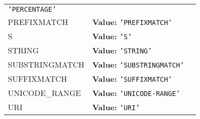 \begin{longtable}{|p{\varnamewidth}|p{\vardescrwidth}|l}
{\tt \texttt{'}\texttt{PERCENTAGE}\texttt{'}}&\\
\cline{1-2}
\raggedright P\-R\-E\-F\-I\-X\-M\-A\-T\-C\-H\- & \raggedright \textbf{Value:} 
{\tt \texttt{'}\texttt{PREFIXMATCH}\texttt{'}}&\\
\cline{1-2}
\raggedright S\- & \raggedright \textbf{Value:} 
{\tt \texttt{'}\texttt{S}\texttt{'}}&\\
\cline{1-2}
\raggedright S\-T\-R\-I\-N\-G\- & \raggedright \textbf{Value:} 
{\tt \texttt{'}\texttt{STRING}\texttt{'}}&\\
\cline{1-2}
\raggedright S\-U\-B\-S\-T\-R\-I\-N\-G\-M\-A\-T\-C\-H\- & \raggedright \textbf{Value:} 
{\tt \texttt{'}\texttt{SUBSTRINGMATCH}\texttt{'}}&\\
\cline{1-2}
\raggedright S\-U\-F\-F\-I\-X\-M\-A\-T\-C\-H\- & \raggedright \textbf{Value:} 
{\tt \texttt{'}\texttt{SUFFIXMATCH}\texttt{'}}&\\
\cline{1-2}
\raggedright U\-N\-I\-C\-O\-D\-E\-\_\-R\-A\-N\-G\-E\- & \raggedright \textbf{Value:} 
{\tt \texttt{'}\texttt{UNICODE-RANGE}\texttt{'}}&\\
\cline{1-2}
\raggedright U\-R\-I\- & \raggedright \textbf{Value:} 
{\tt \texttt{'}\texttt{URI}\texttt{'}}&\\
\cline{1-2}
\end{longtable}

